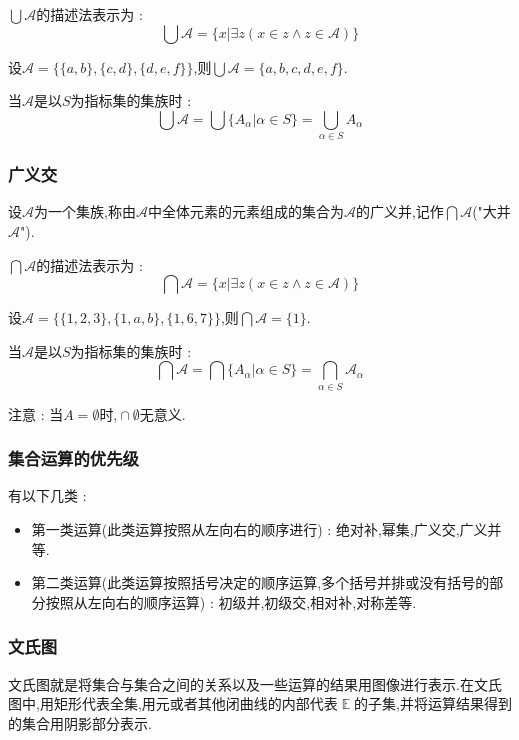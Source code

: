 \documentclass[UTF8,12pt]{ctexbook}
\DeclareMathOperator{\mathEverythingCollection}{\mathbb{E}}
\DeclareMathOperator{\intersectionSet}{\cap}
\begin{document}
{{{{{  $\bigcup \mathcal{A}$的描述法表示为 : $$
    \bigcup\mathcal{A} = \{x | \exists z (x \in z \land z \in \mathcal{A})\}
  $$

  设$\mathcal{A} = \{\{a,b\},\{c,d\},\{d,e,f\}\}$,则$\bigcup \mathcal{A} = \{a,b,c,d,e,f\}$.

  当$\mathcal{A}$是以$S$为指标集的集族时 : $$
    \bigcup\mathcal{A} = \bigcup\{A_\alpha | \alpha \in S\} = \bigcup_{\alpha \in S}A_\alpha
  $$
}%

\subsubsection{广义交}{
  设$\mathcal{A}$为一个集族,称由$\mathcal{A}$中全体元素的元素组成的集合为$\mathcal{A}$的广义并,记作$\bigcap \mathcal{A}$("大并$\mathcal{A}$").

  $\bigcap \mathcal{A}$的描述法表示为 : $$
    \bigcap\mathcal{A} = \{x | \exists z (x \in z \land z \in \mathcal{A})\}
  $$

  设$\mathcal{A} = \{\{1,2,3\},\{1,a,b\},\{1,6,7\}\}$,则$\bigcap \mathcal{A} = \{1\}$.

  当$\mathcal{A}$是以$S$为指标集的集族时 : $$
    \bigcap\mathcal{A} = \bigcap\{A_\alpha | \alpha \in S\} = \bigcap_{\alpha \in S}\mathcal{A}_\alpha
  $$

  注意 : 当$A = \emptyset$时,$\intersectionSet \emptyset$无意义.
}%

\subsubsection{集合运算的优先级}{
  有以下几类 :

  \begin{itemize}
    \item 第一类运算(此类运算按照从左向右的顺序进行) : 绝对补,幂集,广义交,广义并等.
    \item 第二类运算(此类运算按照括号决定的顺序运算,多个括号并排或没有括号的部分按照从左向右的顺序运算) : 初级并,初级交,相对补,对称差等.
  \end{itemize}
}%

\subsubsection{文氏图}{
  文氏图就是将集合与集合之间的关系以及一些运算的结果用图像进行表示.在文氏图中,用矩形代表全集,用元或者其他闭曲线的内部代表$\mathEverythingCollection$的子集,并将运算结果得到的集合用阴影部分表示.

}}}}}
\end{document}
